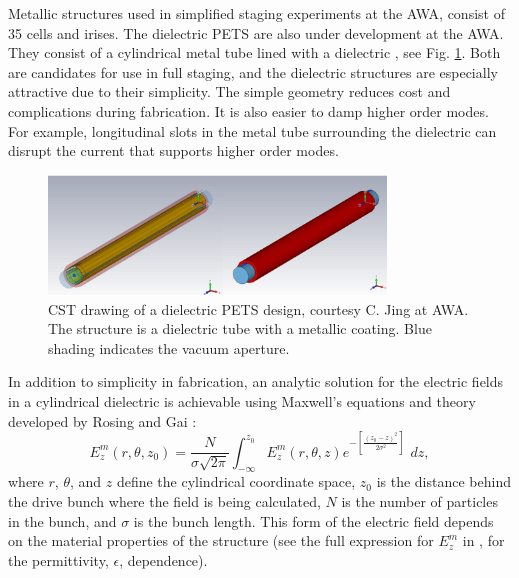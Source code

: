 Metallic structures used in simplified staging experiments at the AWA, consist of 35 cells and irises. 
The dielectric PETS are also under development at the AWA. 
They consist of a cylindrical metal tube lined with a dielectric \cite{PETSeq}, 
see Fig. \ref{fig:PETS}. Both are candidates for use in full staging, and 
the dielectric structures are especially attractive due to their simplicity. 
The simple geometry reduces cost and complications during fabrication.
It is also easier to damp higher order modes. For example, longitudinal slots in the metal tube surrounding
the dielectric can disrupt the current that supports higher order modes.   
\begin{figure}
	\begin{center}
		\includegraphics[width=0.8\textwidth]{images/pets-cst.png}
		\caption{CST drawing of a dielectric PETS design, courtesy C. Jing at AWA. 
		The structure is a dielectric tube with a metallic coating. Blue shading 
	indicates the vacuum aperture.}
		\label{fig:PETS}
	\end{center}
\end{figure}
In addition to simplicity in fabrication, an analytic solution for the electric fields
in a cylindrical dielectric is achievable using Maxwell's equations and theory developed
by Rosing and Gai \cite{RosingWei}: 
\begin{equation}
E^m_z\left(r,\theta,z_0\right)= \frac{N}{\sigma \sqrt{2\pi}}\int_{-\infty}^{z_0}E^m_z\left(r,\theta,z\right)e^{-\left[\frac{\left(z_0-z\right)^2}{2\sigma^2}\right]}\,\,dz , 
\end{equation}
where $r$, $\theta$, and $z$ define the cylindrical coordinate space, 
$z_0$ is the distance behind the drive bunch where the field is being calculated, 
$N$ is the number of particles in the bunch, and $\sigma$ is the bunch length.
This form of the electric field depends on the material properties of the structure
(see the full expression for $E_z^m$ in \cite{RosingWei}, for the permittivity, $\epsilon$, dependence).
